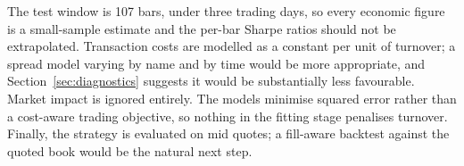 \documentclass[11pt]{article}
\begin{document}
The test window is 107 bars, under three trading days, so every
economic figure is a small-sample estimate and the per-bar Sharpe ratios should
not be extrapolated. Transaction costs are modelled as a constant per unit of
turnover; a spread model varying by name and by time would be more
appropriate, and Section~\ref{sec:diagnostics} suggests it would be
substantially less favourable. Market impact is ignored entirely. The models
minimise squared error rather than a cost-aware trading objective, so nothing
in the fitting stage penalises turnover. Finally, the strategy is evaluated on
mid quotes; a fill-aware backtest against the quoted book would be the natural
next step.
\end{document}
